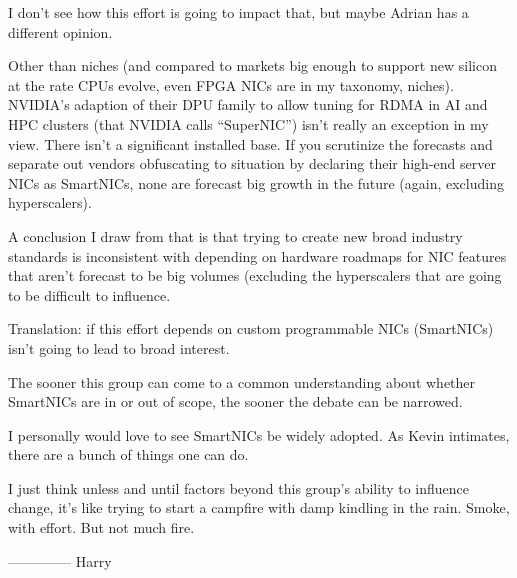 I don’t see how this effort is going to impact that, but maybe Adrian has a different opinion.

Other than niches (and compared to markets big enough to support new silicon at the rate CPUs evolve, even FPGA NICs are in my taxonomy, niches). NVIDIA’s adaption of their DPU family to allow tuning for RDMA in AI and HPC clusters (that NVIDIA calls “SuperNIC”) isn’t really an exception in my view.  There isn’t a significant installed base. If you scrutinize the forecasts and separate out vendors obfuscating to situation by declaring their high-end server NICs as SmartNICs, none are forecast big growth in the future (again, excluding hyperscalers).

A conclusion I draw from that is that trying to create new broad industry standards is inconsistent with depending on hardware roadmaps for NIC features that aren’t forecast to be big volumes (excluding the hyperscalers that are going to be difficult to influence.

Translation: if this effort depends on custom programmable NICs (SmartNICs) isn’t going to lead to broad interest.

The sooner this group can come to a common understanding about whether SmartNICs are in or out of scope, the sooner the debate can be narrowed.

I personally would love to see SmartNICs be widely adopted. As Kevin intimates, there are a bunch of things one can do.

I just think unless and until factors beyond this group’s ability to influence change, it’s like trying to start a campfire with damp kindling in the rain. Smoke, with effort. But not much fire.


\bigskip
% 
--------------
Harry
